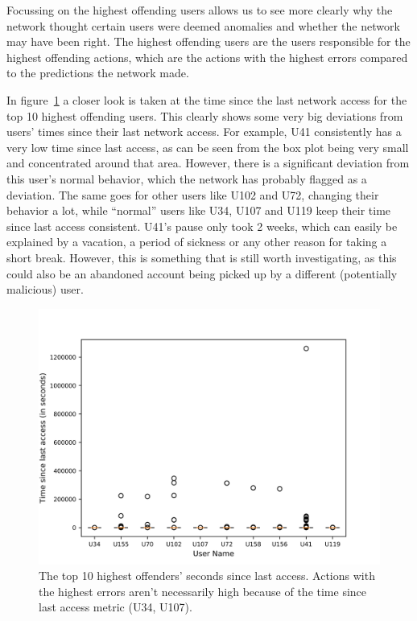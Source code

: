Focussing on the highest offending users allows us to see more clearly why the network thought certain users were deemed anomalies and whether the network may have been right. The highest offending users are the users responsible for the highest offending actions, which are the actions with the highest errors compared to the predictions the network made.

In figure~\ref{fig:time_since_last_access} a closer look is taken at the time since the last network access for the top 10 highest offending users. This clearly shows some very big deviations from users' times since their last network access. For example, U41 consistently has a very low time since last access, as can be seen from the box plot being very small and concentrated around that area. However, there is a significant deviation from this user's normal behavior, which the network has probably flagged as a deviation. The same goes for other users like U102 and U72, changing their behavior a lot, while \enquote{normal} users like U34, U107 and U119 keep their time since last access consistent. U41's pause only took 2 weeks, which can easily be explained by a vacation, a period of sickness or any other reason for taking a short break. However, this is something that is still worth investigating, as this could also be an abandoned account being picked up by a different (potentially malicious) user.

\begin{figure}
	\begin{center}
		\includegraphics[scale=1.6]{results/highest_offender_time_since_last_access}
	\end{center}
	\caption{The top 10 highest offenders' seconds since last access. Actions with the highest errors aren't necessarily high because of the time since last access metric (U34, U107).~\label{fig:time_since_last_access}}
\end{figure}

